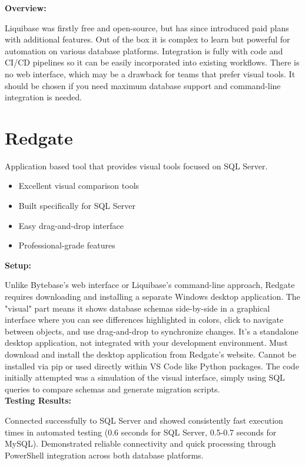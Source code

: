 \documentclass[11pt,a4paper]{article}
\begin{document}
\textbf{Overview:}

Liquibase was firstly free and open-source, but has since introduced paid plans with additional features.
Out of the box it is complex to learn but powerful for automation on various database platforms.
Integration is fully with code and CI/CD pipelines so it can be easily incorporated into existing workflows.
There is no web interface, which may be a drawback for teams that prefer visual tools.
It should be chosen if you need maximum database support and command-line integration is needed.\\

\newpage
\section{Redgate}

Application based tool that provides visual tools focused on SQL Server.

\begin{itemize}
    \item Excellent visual comparison tools
    \item Built specifically for SQL Server
    \item Easy drag-and-drop interface
    \item Professional-grade features
\end{itemize}

\textbf{Setup:}

Unlike Bytebase's web interface or Liquibase's command-line approach, Redgate requires downloading and installing a separate Windows desktop application.
The "visual" part means it shows database schemas side-by-side in a graphical interface where you can see differences highlighted in colors, click to navigate between objects, and use drag-and-drop to synchronize changes.
It's a standalone desktop application, not integrated with your development environment.
Must download and install the desktop application from Redgate's website.
Cannot be installed via pip or used directly within VS Code like Python packages.
The code initially attempted was a simulation of the visual interface, simply using SQL queries to compare schemas and generate migration scripts.\\

\textbf{Testing Results:}

Connected successfully to SQL Server and showed consistently fast execution times in automated testing (0.6 seconds for SQL Server, 0.5-0.7 seconds for MySQL).
Demonstrated reliable connectivity and quick processing through PowerShell integration across both database platforms.\\
\end{document}
